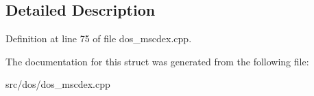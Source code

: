 \subsection{Detailed Description}


Definition at line 75 of file dos\-\_\-mscdex.\-cpp.



The documentation for this struct was generated from the following file\-:\begin{DoxyCompactItemize}
\item 
src/dos/dos\-\_\-mscdex.\-cpp\end{DoxyCompactItemize}
